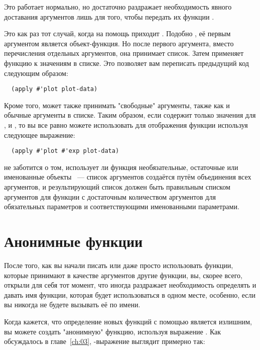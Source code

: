 Это работает нормально, но достаточно раздражает необходимость явного доставания
аргументов лишь для того, чтобы передать их функции .

Это как раз тот случай, когда на помощь приходит .  Подобно , её
первым аргументом является объект-функция.  Но после первого аргумента, вместо
перечисления отдельных аргументов, она принимает список.  Затем  применяет
функцию к значениям в списке.  Это позволяет вам переписать предыдущий код следующим
образом:

\begin{lstlisting}
  (apply #'plot plot-data)
\end{lstlisting}

Кроме того,  может также принимать "свободные" аргументы, также как и обычные
аргументы в списке. Таким образом, если  содержит только значения для
,  и , то вы все равно можете использовать  для
отображения функции  используя следующее выражение:

\begin{lstlisting}
  (apply #'plot #'exp plot-data)
\end{lstlisting}

 не заботится о том, использует ли функция необязательные, остаточные или
именованные объекты ~--- список аргументов создаётся путём объединения всех аргументов, и
результирующий список должен быть правильным списком аргументов для функции с достаточным
количеством аргументов для обязательных параметров и соответствующими именованными
параметрами.

\section{Анонимные функции}

После того, как вы начали писать или даже просто использовать функции, которые принимают в
качестве аргументов другие функции, вы, скорее всего, открыли для себя тот момент, что
иногда раздражает необходимость определять и давать имя функции, которая будет
использоваться в одном месте, особенно, если вы никогда не будете вызывать её по имени.

Когда кажется, что определение новых функций с помощью  является излишним, вы
можете создать "анонимную" функцию, используя выражение .  Как обсуждалось в
главе~\ref{ch:03}, -выражение выглядит примерно так:

